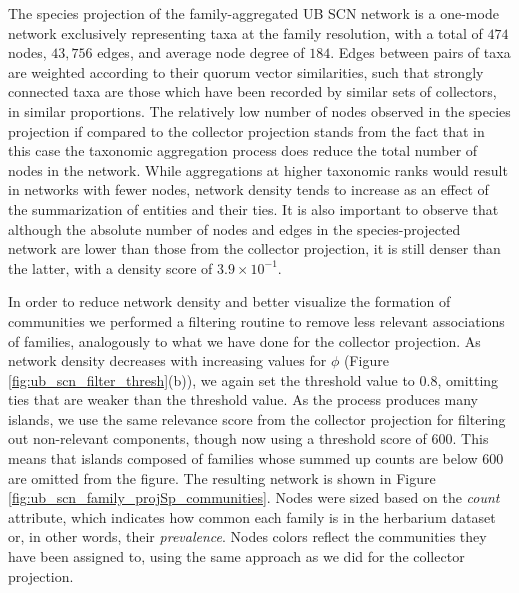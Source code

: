 The species projection of the family-aggregated UB SCN network is a one-mode network exclusively representing taxa at the family resolution, with a total of $474$ nodes, $43,756$ edges, and average node degree of $184$.
Edges between pairs of taxa are weighted according to their quorum vector similarities, such that strongly connected taxa are those which have been recorded by similar sets of collectors, in similar proportions.
%
The relatively low number of nodes observed in the species projection if compared to the collector projection stands from the fact that in this case the taxonomic aggregation process does reduce the total number of nodes in the network.
While aggregations at higher taxonomic ranks would result in networks with fewer nodes, network density tends to increase as an effect of the summarization of entities and their ties.
%
It is also important to observe that although the absolute number of nodes and edges in the species-projected network are lower than those from the collector projection, it is still denser than the latter, with a density score of $3.9 \times 10^{-1}$.

In order to reduce network density and better visualize the formation of communities we performed a filtering routine to remove less relevant associations of families, analogously to what we have done for the collector projection.
As network density decreases with increasing values for $\phi$ (Figure \ref{fig:ub_scn_filter_thresh}(b)), we again set the threshold value to $0.8$, omitting ties that are weaker than the threshold value. 
As the process produces many islands, we use the same relevance score from the collector projection for filtering out non-relevant components, though now using a threshold score of $600$. 
This means that islands composed of families whose summed up counts are below $600$ are omitted from the figure. 
The resulting network is shown in Figure \ref{fig:ub_scn_family_projSp_communities}.
Nodes were sized based on the \textit{count} attribute, which indicates how common each family is in the herbarium dataset or, in other words, their \textit{prevalence}. 
Nodes colors reflect the communities they have been assigned to, using the same approach as we did for the collector projection.

